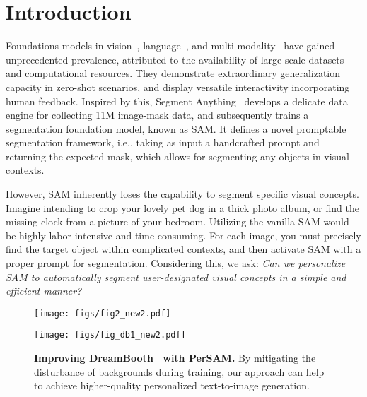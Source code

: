 \documentclass{article} \usepackage{iclr2024_conference,times}
\makeatletter
\newcommand\figcaption{\def\@captype{figure}\caption}
\makeatother
\begin{document}
\section{Introduction}

Foundations models in vision~\citep{li2022uni,zou2023segment,wang2022images}, language~\citep{brown2020language,touvron2023llama,radford2019language}, and multi-modality~\citep{radford2021learning,jia2021scaling,li2023blip} have gained unprecedented prevalence, attributed to the availability of large-scale datasets and computational resources. They demonstrate extraordinary generalization capacity in zero-shot scenarios, and display versatile interactivity incorporating human feedback. Inspired by this, Segment Anything~\citep{kirillov2023segment} develops a delicate data engine for collecting 11M image-mask data, and subsequently trains a segmentation foundation model, known as SAM. It defines a novel promptable segmentation framework, i.e., taking as input a handcrafted prompt and returning the expected mask, which allows for segmenting any objects in visual contexts.


However, SAM inherently loses the capability to segment specific visual concepts. Imagine intending to crop your lovely pet dog in a thick photo album, or find the missing clock from a picture of your bedroom.
Utilizing the vanilla SAM would be highly labor-intensive and time-consuming. For each image, you must precisely find the target object within complicated contexts, and then activate SAM with a proper prompt for segmentation. Considering this, we ask: \textit{Can we personalize SAM to automatically segment user-designated visual concepts in a simple and efficient manner?}



\begin{figure*}[t!]
\vspace{-0.2cm}
\begin{minipage}[t]{0.48\textwidth}
\texttt{[image: figs/fig2\_new2.pdf]}
\figcaption{\textbf{Personalized Segmentation Examples.} Our PerSAM (Left) can segment personal objects in any context with favorable performance, and PerSAM-F (right) further alleviates the ambiguity issue by scale-aware fine-tuning.}
\label{fig2}
\end{minipage}
\hspace{0.1in}
\vspace{-0.2cm}
\begin{minipage}[t]{0.48\textwidth}
\texttt{[image: figs/fig\_db1\_new2.pdf]}
\figcaption{\textbf{Improving DreamBooth~\citep{ruiz2022dreambooth} with PerSAM.} By mitigating the disturbance of backgrounds during training, our approach can help to achieve higher-quality personalized text-to-image generation.}
\label{fig_db1}
\end{minipage}
\end{figure*}
\end{document}
